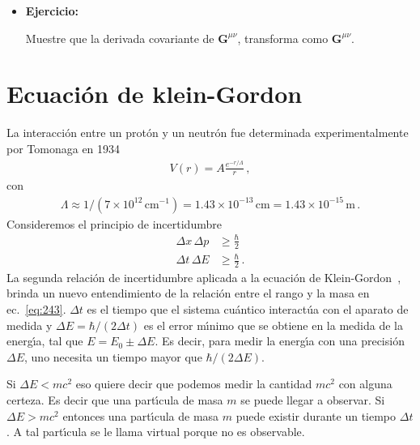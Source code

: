 \begin{itemize}
\item \textbf{Ejercicio:}

Muestre que la derivada covariante de $\mathbf{G}^{\mu\nu}$, transforma como $\mathbf{G}^{\mu\nu}$.
\end{itemize}



\section{Ecuaci\'on de klein-Gordon}
\label{sec:ecuacion-de-klein}
La interacci\'on entre un prot\'on y un neutr\'on fue determinada experimentalmente por Tomonaga en 1934 \cite{history}
\begin{align}
\label{eq:243}
  V(r)={A}\frac{e^{-r/\Lambda }}{r}\,,
\end{align}
con
\begin{align}
  \label{eq:245}
  \Lambda\approx1/(7\times10^{12}\,\text{cm}^{-1})=1.43\times10^{-13}\,\text{cm}=1.43\times10^{-15}\,\text{m}\,.
\end{align}
Consideremos el principio de incertidumbre
\begin{align}
  \Delta x\, \Delta p &\geq \frac{\hbar}{2}\nonumber\\
\Delta t\, \Delta E&\geq\frac{\hbar}{2}\,.
\end{align}
La segunda relaci\'on de incertidumbre
aplicada a la ecuación de Klein-Gordon~\cite{Aitchison:2003tq}, brinda un nuevo entendimiento de la relaci\'on entre el rango y la masa en ec.~\eqref{eq:243}. $\Delta t$ es el tiempo que el sistema cu\'antico interact\'ua con el aparato de medida y $\Delta E=\hbar/(2\Delta t)$ es el error m\'\i nimo que se obtiene en la medida de la energ\'\i a, tal que $E=E_0\pm\Delta E$. Es decir, para medir la energ\'\i a con una precisi\'on $\Delta E$, uno necesita un tiempo mayor que $\hbar/(2\Delta E)$.

Si $\Delta E< mc^2$ eso quiere decir que podemos medir la cantidad $mc^2$ con alguna certeza. Es decir que una part\'\i cula de masa $m$ se puede llegar a observar. Si $\Delta E>mc^2$ entonces una part\'\i cula de masa $m$ puede existir durante un tiempo $\Delta t$. A tal part\'\i cula se le llama virtual porque no es observable. 

